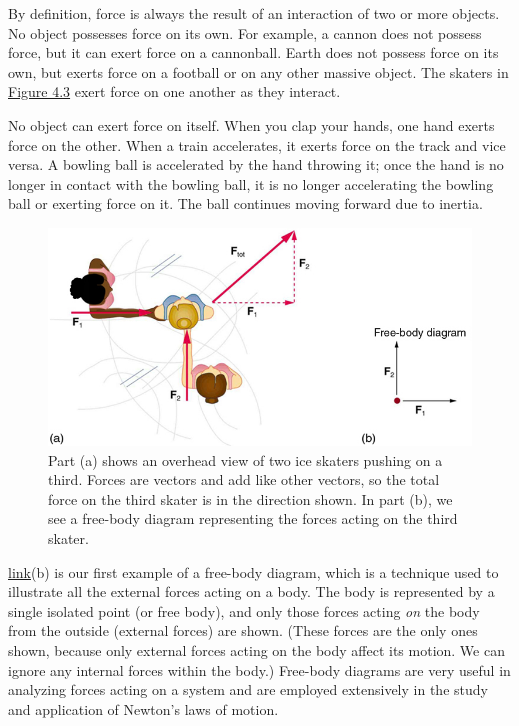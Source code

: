 \documentclass[
]{book}
\begin{document}
By definition, force is always the result of an interaction of two or
more objects. No object possesses force on its own. For example, a
cannon does not possess force, but it can exert force on a cannonball.
Earth does not possess force on its own, but exerts force on a football
or on any other massive object. The skaters in \protect\hyperlink{import-auto-id2379809}{Figure
4.3} exert force on one another as they
interact.

No object can exert force on itself. When you clap your hands, one hand
exerts force on the other. When a train accelerates, it exerts force on
the track and vice versa. A bowling ball is accelerated by the hand
throwing it; once the hand is no longer in contact with the bowling
ball, it is no longer accelerating the bowling ball or exerting force on
it. The ball continues moving forward due to inertia.

\begin{figure}
\hypertarget{import-auto-id2379809}{%
\centering
\includegraphics{images/Figure 04_01_01.jpg}
\caption{Part (a) shows an overhead view of two ice skaters pushing on a third.
Forces are vectors and add like other vectors, so the total force on the
third skater is in the direction shown. In part (b), we see a free-body
diagram representing the forces acting on the third
skater.}\label{import-auto-id2379809}
}
\end{figure}

\protect\hyperlink{import-auto-id2379809}{link}(b) is our first
example of a \protect\hypertarget{import-auto-id1590568}{}{free-body diagram}, which is a technique used to illustrate all the
\protect\hypertarget{import-auto-id1608860}{}{external forces} acting on a
body. The body is represented by a single isolated point (or free body),
and only those forces acting \emph{on} the body from the outside (external
forces) are shown. (These forces are the only ones shown, because only
external forces acting on the body affect its motion. We can ignore any
internal forces within the body.) Free-body diagrams are very useful in
analyzing forces acting on a system and are employed extensively in the
study and application of Newton's laws of motion.
\end{document}
